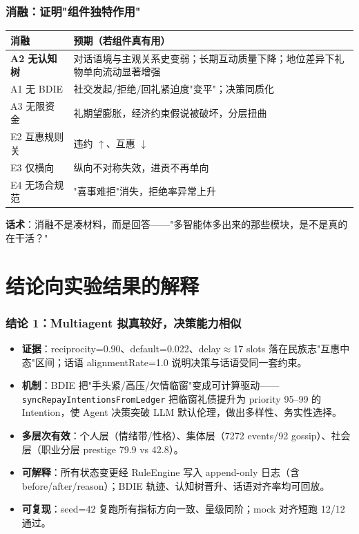 \documentclass[AutoFakeBold,AutoFakeSlant]{beamer}
\begin{document}
\begin{frame}
    \frametitle{消融：证明"组件独特作用"}
    \small
    \begin{tabularx}{\textwidth}{|l|X|}
        \toprule
        \textbf{消融} & \textbf{预期（若组件真有用）} \\
        \midrule
        \textbf{A2 无认知树} & 对话语境与主观关系史变弱；长期互动质量下降；地位差异下礼物单向流动显著增强 \\
        \midrule
        A1 无 BDIE & 社交发起/拒绝/回礼紧迫度"变平"；决策同质化 \\
        \midrule
        A3 无限资金 & 礼期望膨胀，经济约束假说被破坏，分层扭曲 \\
        \midrule
        E2 互惠规则关 & 违约 $\uparrow$、互惠 $\downarrow$ \\
        \midrule
        E3 仅横向 & 纵向不对称失效，进贡不再单向 \\
        \midrule
        E4 无场合规范 & "喜事难拒"消失，拒绝率异常上升 \\
        \bottomrule
    \end{tabularx}
    \vspace{0.3em}
    \scriptsize
    \textbf{话术}：消融不是凑材料，而是回答——"多智能体多出来的那些模块，是不是真的在干活？"
\end{frame}

\section{结论向实验结果的解释}

\begin{frame}
    \frametitle{结论 1：Multiagent 拟真较好，决策能力相似}
    \small
    \begin{itemize}
        \item \textbf{证据}：reciprocity=0.90、default=0.022、delay$\approx$17 slots 落在民族志"互惠中态"区间；话语 alignmentRate=1.0 说明决策与话语受同一套约束。
        \item \textbf{机制}：BDIE 把"手头紧/高压/欠情临窗"变成可计算驱动——\texttt{syncRepayIntentionsFromLedger} 把临窗礼债提升为 priority 95--99 的 Intention，使 Agent 决策突破 LLM 默认伦理，做出多样性、务实性选择。
        \item \textbf{多层次有效}：个人层（情绪带/性格）、集体层（7272 events/92 gossip）、社会层（职业分层 prestige 79.9 vs 42.8）。
        \item \textbf{可解释}：所有状态变更经 RuleEngine 写入 append-only 日志（含 before/after/reason）；BDIE 轨迹、认知树晋升、话语对齐率均可回放。
        \item \textbf{可复现}：seed=42 复跑所有指标方向一致、量级同阶；mock 对齐短跑 12/12 通过。
    \end{itemize}
\end{frame}
\end{document}
